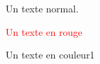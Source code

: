 \documentclass{article}
\begin{document}
	
	Un texte normal. 
	
	\textcolor{red}{Un texte en rouge}
	
	\textcolor{couleur1}{Un texte en couleur1}
	
\end{document}
